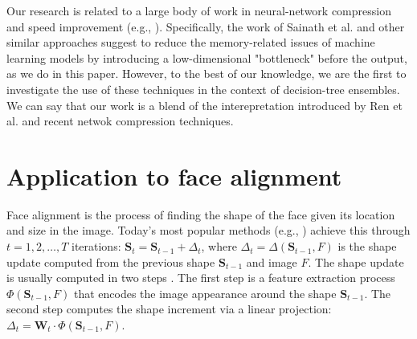 \documentclass{article}
\begin{document}
		Our research is related to a large body of work in neural-network compression and speed improvement (e.g., \cite{speechrecog,speechrecog2,googlenet,exploiting,deepcompr}).
		Specifically, the work of Sainath et al. \cite{speechrecog} and other similar approaches suggest to reduce the memory-related issues of machine learning models by introducing a low-dimensional "bottleneck" before the output, as we do in this paper.
		However, to the best of our knowledge, we are the first to investigate the use of these techniques in the context of decision-tree ensembles.
		We can say that our work is a blend of the interepretation introduced by Ren et al. \cite{lbf} and recent netwok compression techniques.



\section{Application to face alignment}
	Face alignment is the process of finding the shape of the face given its location and size in the image.
	Today's most popular methods (e.g., \cite{microsoft_face_align,SDM,lbf}) achieve this through $t=1, 2, \ldots, T$ iterations:
	$\mathbf{S}_t=\mathbf{S}_{t-1} + \Delta_t$, where $\Delta_t=\Delta(\mathbf{S}_{t-1}, F)$ is the shape update computed from the previous shape $\mathbf{S}_{t-1}$ and image $F$.
	The shape update is usually computed in two steps \cite{SDM,lbf}.
	The first step is a feature extraction process $\Phi(\mathbf{S}_{t-1}, F)$ that encodes the image appearance around the shape $\mathbf{S}_{t-1}$.
	The second step computes the shape increment via a linear projection: $\Delta_t=\mathbf{W}_t\cdot\Phi(\mathbf{S}_{t-1}, F)$.
\end{document}
